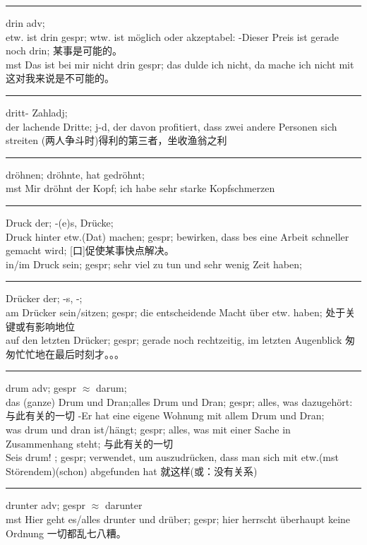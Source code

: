 \noindent\rule{\textwidth}{1pt}
drin adv;\\
etw. ist drin gespr; wtw. ist m\"oglich oder akzeptabel: -Dieser Preis ist gerade noch drin; 某事是可能的。\\
mst Das ist bei mir nicht drin gespr; das dulde ich nicht, da mache ich nicht mit 这对我来说是不可能的。\\

\noindent\rule{\textwidth}{1pt}
dritt- Zahladj; \\
der lachende Dritte; j-d, der davon profitiert, dass zwei andere Personen sich streiten (两人争斗时)得利的第三者，坐收渔翁之利\\

\noindent\rule{\textwidth}{1pt}
dr\"ohnen; dr\"ohnte, hat gedr\"ohnt; \\
mst Mir dr\"ohnt der Kopf; ich habe sehr starke Kopfschmerzen \\

\noindent\rule{\textwidth}{1pt}
Druck der; -(e)s, Dr\"ucke; \\
Druck hinter etw.(Dat) machen; gespr; bewirken, dass bes eine Arbeit schneller gemacht wird; [口]促使某事快点解决。\\
in/im Druck sein; gespr; sehr viel zu tun und sehr wenig Zeit haben;  \\

\noindent\rule{\textwidth}{1pt}
Dr\"ucker der; -s, -;\\
am Dr\"ucker sein/sitzen; gespr; die entscheidende Macht \"uber etw. haben; 处于关键或有影响地位\\
auf den letzten Dr\"ucker; gespr; gerade noch rechtzeitig, im letzten Augenblick 匆匆忙忙地在最后时刻才。。。\\

\noindent\rule{\textwidth}{1pt}
drum adv; gespr $\approx$ darum;\\
das (ganze) Drum und Dran;alles Drum und Dran; gespr; alles, was dazugeh\"ort:与此有关的一切 -Er hat eine eigene Wohnung mit allem Drum und Dran;\\
was drum und dran ist/h\"angt; gespr; alles, was mit einer Sache in Zusammenhang steht; 与此有关的一切\\
Seis drum! ; gespr; verwendet, um auszudr\"ucken, dass man sich mit etw.(mst St\"orendem)(schon) abgefunden hat 就这样(或：没有关系)\\

\noindent\rule{\textwidth}{1pt}
drunter adv; gespr $\approx$ darunter \\
mst Hier geht es/alles drunter und dr\"uber; gespr; hier herrscht \"uberhaupt keine Ordnung 一切都乱七八糟。\\


